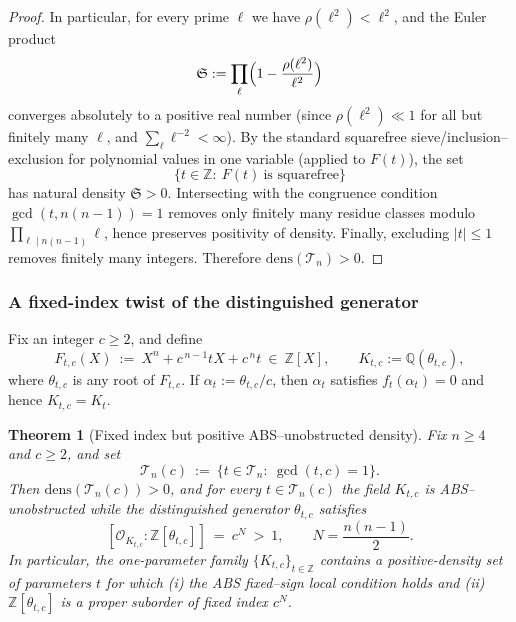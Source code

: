 \documentclass[11pt,letterpaper]{amsart}
\newcommand{\Z}{\mathbb{Z}}
\newcommand{\Q}{\mathbb{Q}}
\newcommand{\Ocal}{\mathcal{O}}
\theoremstyle{plain}
\newtheorem{theorem}{Theorem}[section]
\theoremstyle{definition}
\theoremstyle{remark}
\theoremstyle{plain}
\begin{document}
\begin{proof}
In particular, for every prime $\ell$ we have $\rho(\ell^2)<\ell^2$, and the Euler product
\[
\mathfrak S:=\prod_{\ell}\Bigl(1-\frac{\rho(\ell^2)}{\ell^2}\Bigr)
\]
converges absolutely to a positive real number (since $\rho(\ell^2)\ll 1$ for all but finitely many $\ell$,
and $\sum_\ell \ell^{-2}<\infty$). By the standard squarefree sieve/inclusion--exclusion for polynomial values
in one variable (applied to $F(t)$), the set
\[
\{t\in\Z:\ F(t)\ \text{is squarefree}\}
\]
has natural density $\mathfrak S>0$. Intersecting with the congruence condition $\gcd(t,n(n-1))=1$
removes only finitely many residue classes modulo $\prod_{\ell\mid n(n-1)}\ell$, hence preserves positivity
of density. Finally, excluding $|t|\le 1$ removes finitely many integers. Therefore $\mathrm{dens}(\mathcal T_n)>0$.

\end{proof}

\subsubsection{A fixed-index twist of the distinguished generator}

Fix an integer $c\ge 2$, and define
\[
F_{t,c}(X)\ :=\ X^n+c^{\,n-1}tX+c^{\,n}t\ \in\ \Z[X],\qquad K_{t,c}:=\Q(\theta_{t,c}),
\]
where $\theta_{t,c}$ is any root of $F_{t,c}$.
If $\alpha_t:=\theta_{t,c}/c$, then $\alpha_t$ satisfies $f_t(\alpha_t)=0$ and hence $K_{t,c}=K_t$.

\begin{theorem}[Fixed index but positive \textsc{ABS}--unobstructed density]
\label{thm:fixed-index-twist}
Fix $n\ge 4$ and $c\ge 2$, and set
\[
\mathcal T_{n}(c)\ :=\ \{t\in \mathcal T_n:\ \gcd(t,c)=1\}.
\]
Then $\mathrm{dens}(\mathcal T_n(c))>0$, and for every $t\in \mathcal T_n(c)$ the field $K_{t,c}$ is \textsc{ABS}--unobstructed while
the distinguished generator $\theta_{t,c}$ satisfies
\[
[\Ocal_{K_{t,c}}:\Z[\theta_{t,c}]]\ =\ c^{N}\ >\ 1,
\qquad N=\frac{n(n-1)}2.
\]
In particular, the one-parameter family $\{K_{t,c}\}_{t\in\Z}$ contains a positive-density set of parameters $t$
for which \emph{(i)} the \textsc{ABS} fixed--sign local condition holds and \emph{(ii)} $\Z[\theta_{t,c}]$ is a proper
suborder of fixed index $c^{N}$.
\end{theorem}
\end{document}

